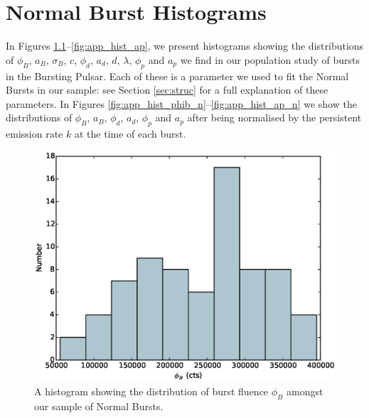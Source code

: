 \chapter{Normal Burst Histograms}
\label{app:hists}

\par In Figures \ref{fig:app_hist_phib}--\ref{fig:app_hist_ap}, we present histograms showing the distributions of $\phi_B$, $a_B$, $\sigma_B$, $c$, $\phi_d$, $a_d$, $d$, $\lambda$, $\phi_p$ and $a_p$ we find in our population study of bursts in the Bursting Pulsar.  Each of these is a parameter we used to fit the Normal Bursts in our sample: see Section \ref{sec:struc} for a full explanation of these parameters.  In Figures \ref{fig:app_hist_phib_n}--\ref{fig:app_hist_ap_n} we show the distributions of $\phi_B$, $a_B$, $\phi_d$, $a_d$, $\phi_p$ and $a_p$ after being normalised by the persistent emission rate $k$ at the time of each burst.

\begin{figure}
  \centering
  \includegraphics[width=.9\linewidth, trim={0cm 0 0cm 0},clip]{images/appendix_burst_aafluence_hist.eps}
  \caption{\small A histogram showing the distribution of burst fluence $\phi_B$ amongst our sample of Normal Bursts.}
  \label{fig:app_hist_phib}
\end{figure}

